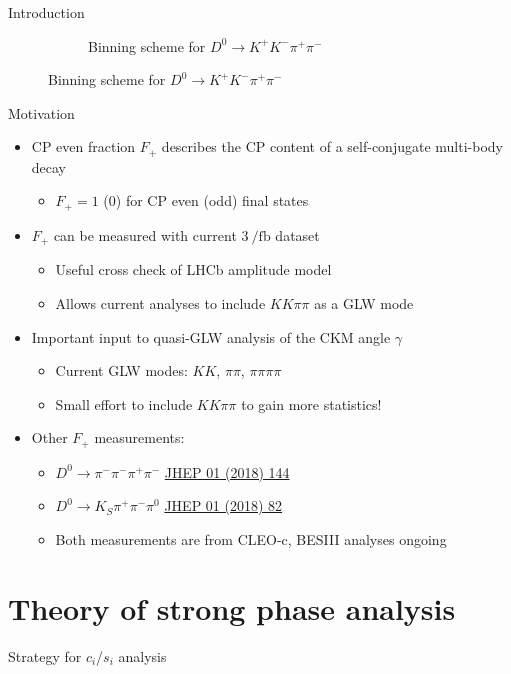 \documentclass{beamer}
\begin{document}
\begin{frame}{Introduction}
\begin{figure}
\begin{subfigure}{0.5\textwidth}
      \caption{Binning scheme for $D^0\to K^+K^-\pi^+\pi^-$}
    \end{subfigure}
  \end{figure}
\end{frame}

\begin{frame}{Motivation}
  \begin{itemize}
    \setlength\itemsep{1.5em}
    \item{CP even fraction $F_+$ describes the CP content of a self-conjugate multi-body decay}
    \begin{itemize}
      \item{$F_+ = 1$ ($0$) for CP even (odd) final states}
    \end{itemize}
    \item{$F_+$ can be measured with current $\SI{3}{\per\femto\barn}$ dataset}
    \begin{itemize}
      \item{Useful cross check of LHCb amplitude model}
      \item{Allows current analyses to include $KK\pi\pi$ as a GLW mode}
    \end{itemize}
    \item{Important input to quasi-GLW analysis of the CKM angle $\gamma$}
    \begin{itemize}
      \item{Current GLW modes: $KK$, $\pi\pi$, $\pi\pi\pi\pi$}
      \item{Small effort to include $KK\pi\pi$ to gain more statistics!}
    \end{itemize}
    \item{Other $F_+$ measurements:}
    \begin{itemize}
      \item{$D^0\to\pi^-\pi^-\pi^+\pi^-$ \href{https://arxiv.org/abs/1709.03467}{JHEP 01 (2018) 144}}
      \item{$D^0\to K_S\pi^+\pi^-\pi^0$ \href{https://arxiv.org/abs/1710.10086}{JHEP 01 (2018) 82}}
      \item{Both measurements are from CLEO-c, BESIII analyses ongoing}
    \end{itemize}
  \end{itemize}
\end{frame}

\section{Theory of strong phase analysis}
\begin{frame}{Strategy for $c_i$/$s_i$ analysis}
\end{frame}
\end{document}
